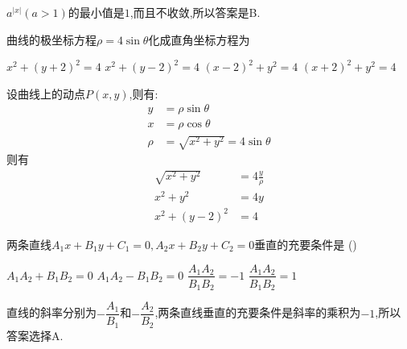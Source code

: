 \begin{questions}
\begin{oneparchoices}
		\choice
	\end{oneparchoices}

	\begin{solution}
		$a^{|x|} (a>1)$的最小值是$1$,而且不收敛,所以答案是B.
	\end{solution}

	\question 曲线的极坐标方程$\rho=4\sin\theta$化成直角坐标方程为 \hfs

	\begin{oneparchoices}
		\choice $x^2 + (y+2)^2 = 4$ \CorrectChoice $x^2 + (y-2)^2 = 4$
		\choice $(x-2)^2 + y^2 = 4$ \choice $(x+2)^2 + y^2 = 4$
	\end{oneparchoices}
	\begin{solution}
		设曲线上的动点$P(x,y)$,则有:
		\begin{align*}
			y    & = \rho\sin\theta                 \\
			x    & = \rho\cos\theta                 \\
			\rho & = \sqrt{x^2 + y^2} = 4\sin\theta
		\end{align*}
		则有
		\begin{align*}
			\sqrt{x^2 + y^2} & = 4\frac{y}{\rho} \\
			x^2 + y^2        & = 4y              \\
			x^2 + (y-2)^2    & = 4
		\end{align*}
	\end{solution}

	\question 两条直线$A_1x + B_1y + C_1 = 0, A_2x + B_2y + C_2=0$垂直的充要条件是 \hfill(\hspace{1cm})

	\begin{oneparchoices}
		\CorrectChoice $A_1A_2 + B_1B_2 =0$ \choice $A_1A_2 - B_1B_2 = 0$ \choice $\dfrac{A_1A_2}{B_1B_2} = -1$
		\choice $\dfrac{A_1A_2}{B_1B_2} = 1$
	\end{oneparchoices}

	\begin{solution}
		直线的斜率分别为$-\dfrac{A_1}{B_1}$和$-\dfrac{A_2}{B_2}$,两条直线垂直的充要条件是斜率的乘积为$-1$,所以答案选择A.
	\end{solution}


\end{questions}
